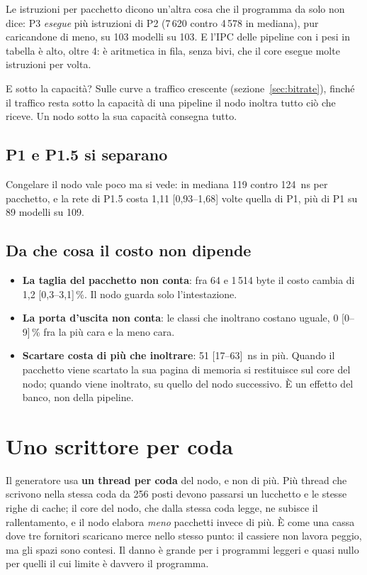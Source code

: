 \documentclass[11pt,a4paper,oneside]{report}
\begin{document}
Le istruzioni per pacchetto dicono un'altra cosa che il programma da solo non
dice: P3 \emph{esegue} più istruzioni di P2 (7\,620 contro 4\,578 in mediana), pur
caricandone di meno, su 103 modelli su 103. E l'IPC delle pipeline con i pesi in
tabella è alto, oltre 4: è aritmetica in fila, senza bivi, che il core esegue
molte istruzioni per volta.

E sotto la capacità? Sulle curve a traffico crescente (sezione~\ref{sec:bitrate}),
finché il traffico resta sotto la capacità di una pipeline il nodo inoltra tutto
ciò che riceve. Un nodo sotto la sua capacità consegna tutto.

\subsection*{P1 e P1.5 si separano}

Congelare il nodo vale poco ma si vede: in mediana 119 contro 124~ns per
pacchetto, e la rete di P1.5 costa 1,11 [0,93--1,68] volte quella di P1, più di
P1 su 89 modelli su 109.

\subsection*{Da che cosa il costo non dipende}

\begin{itemize}
  \item \textbf{La taglia del pacchetto non conta}: fra 64 e 1\,514 byte il costo
        cambia di 1,2 [0,3--3,1]\,\%. Il nodo guarda solo l'intestazione.
  \item \textbf{La porta d'uscita non conta}: le classi che inoltrano costano
        uguale, 0 [0--9]\,\% fra la più cara e la meno cara.
  \item \textbf{Scartare costa di più che inoltrare}: 51 [17--63]~ns in più.
        Quando il pacchetto viene scartato la sua pagina di memoria si restituisce
        sul core del nodo; quando viene inoltrato, su quello del nodo successivo.
        È un effetto del banco, non della pipeline.
\end{itemize}

\section{Uno scrittore per coda}
\label{sec:scrittore}

Il generatore usa \textbf{un thread per coda} del nodo, e non di più. Più thread
che scrivono nella stessa coda da 256 posti devono passarsi un lucchetto e le
stesse righe di cache; il core del nodo, che dalla stessa coda legge, ne subisce
il rallentamento, e il nodo elabora \emph{meno} pacchetti invece di più. È come
una cassa dove tre fornitori scaricano merce nello stesso punto: il cassiere non
lavora peggio, ma gli spazi sono contesi. Il danno è grande per i programmi
leggeri e quasi nullo per quelli il cui limite è davvero il programma.
\end{document}

